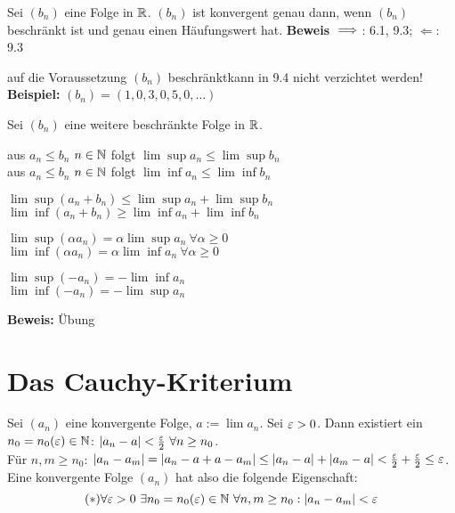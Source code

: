 \documentclass[a4paper,twoside,DIV15,BCOR12mm]{scrbook}
\begin{document}
\begin{folgerung}
Sei $(b_n)$ eine Folge in $\mathbb{R}$. $(b_n)$ ist konvergent genau dann, wenn $(b_n)$ beschränkt ist und genau einen Häufungswert hat.
\textbf{Beweis}
\glqq$\implies$\grqq: 6.1, 9.3; \glqq$\Leftarrow$\grqq: 9.3
\end{folgerung}

\begin{beispiel}
auf die Voraussetzung \glqq$(b_n)$ beschränkt\grqq kann in 9.4 nicht verzichtet werden!\\
\textbf{Beispiel:} $(b_n)=(1,0,3,0,5,0,\ldots)$
\end{beispiel}

\begin{satz}
Sei $(b_n)$ eine weitere beschränkte Folge  in $\mathbb{R}$.
\begin{liste}
\item aus $a_n \le b_n$ \ffa $ n\in\mathbb{N}$ folgt $\lim\sup a_n \le \lim\sup b_n$ \\
aus $a_n \le b_n$ \ffa $ n\in\mathbb{N}$ folgt $\lim\inf a_n \le \lim\inf b_n$
\item $\lim\sup(a_n + b_n) \le \lim\sup a_n + \lim\sup b_n$ \\
$\lim\inf(a_n + b_n) \ge \lim\inf a_n + \lim\inf b_n$
\item $\lim\sup(\alpha a_n) = \alpha\lim\sup a_n \ \forall \alpha \ge 0$\\
$\lim\inf(\alpha a_n) = \alpha\lim\inf a_n \ \forall \alpha \ge 0$
\item $\lim\sup(- a_n) = -\lim\inf a_n$\\
$\lim\inf(- a_n) = -\lim\sup a_n$

\end{liste}
\end{satz}

\textbf{Beweis:} Übung

\chapter{Das Cauchy-Kriterium}

\begin{motivation}
Sei $(a_n)$ eine konvergente Folge, $a:= \lim a_n$. Sei $\varepsilon >0$. Dann existiert ein $n_0 = n_0(\varepsilon) \in \mathbb{N}$: $|a_n - a| < \frac{\varepsilon}{2} \ \forall n \ge n_0$.\\
Für $n,m\ge n_0$: $|a_n - a_m| = |a_n - a + a - a_m| \le |a_n -a| + |a_m -a| < \frac{\varepsilon}{2} + \frac{\varepsilon}{2} \le \varepsilon$.\\
Eine konvergente Folge $(a_n)$ hat also die folgende Eigenschaft:
$$(*) \forall \varepsilon > 0 \ \exists n_0 = n_0(\varepsilon) \in \mathbb{N} \ \forall n,m \ge n_0: |a_n-a_m| < \varepsilon$$
\end{motivation}
\end{document}
